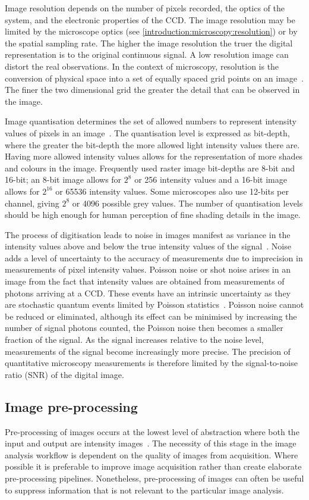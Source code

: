 Image resolution depends on the number of pixels recorded, the optics of the system, and the electronic properties of the CCD. The image resolution may be limited by the microscope optics (see \autoref{introduction:microscopy:resolution}) or by the spatial sampling rate. The higher the image resolution the truer the digital representation is to the original continuous signal. A low resolution image can distort the real observations. In the context of microscopy, resolution is the conversion of physical space into a set of equally spaced grid points on an image~\cite{Russ2006}. The finer the two dimensional grid the greater the detail that can be observed in the image.

Image quantisation determines the set of allowed numbers to represent intensity values of pixels in an image~\cite{Pawley2006}. The quantisation level is expressed as bit-depth, where the greater the bit-depth the more allowed light intensity values there are. Having more allowed intensity values allows for the representation of more shades and colours in the image. Frequently used raster image bit-depths are 8-bit and 16-bit; an 8-bit image allows for $2^{8}$ or 256 intensity values and a 16-bit image allows for $2^{16}$ or 65536 intensity values. Some microscopes also use 12-bits per channel, giving $2^{8}$ or 4096 possible grey values. The number of quantisation levels should be high enough for human perception of fine shading details in the image.

The process of digitisation leads to noise in images manifest as variance in the intensity values above and below the true intensity values of the signal~\cite{Waters2009}. Noise adds a level of uncertainty to the accuracy of measurements due to imprecision in measurements of pixel intensity values. Poisson noise or shot noise arises in an image from the fact that intensity values are obtained from measurements of photons arriving at a CCD. These events have an intrinsic uncertainty as they are stochastic quantum events limited by Poisson statistics~\cite{Pawley2000}. Poisson noise cannot be reduced or eliminated, although its effect can be minimised by increasing the number of signal photons counted, the Poisson noise then becomes a smaller fraction of the signal. As the signal increases relative to the noise level, measurements of the signal become increasingly more precise. The precision of quantitative microscopy measurements is therefore limited by the signal-to-noise ratio (SNR) of the digital image.

\subsection{Image pre-processing}
\label{introduction:image_processing:image_pre-processing}
Pre-processing of images occurs at the lowest level of abstraction where both the input and output are intensity images~\cite{Sonka2007}. The necessity of this stage in the image analysis workflow is dependent on the quality of images from acquisition. Where possible it is preferable to improve image acquisition rather than create elaborate pre-processing pipelines. Nonetheless, pre-processing of images can often be useful to suppress information that is not relevant to the particular image analysis.

